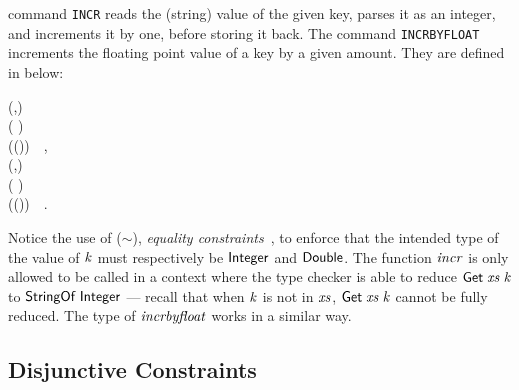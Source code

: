 \Redis{} command \texttt{INCR} reads the (string) value of the given key, parses
it as an integer, and increments it by one, before storing it back. The command
\texttt{INCRBYFLOAT} increments the floating point value of a key by a given
amount. They are defined in \Edis{} below:
\begin{hscode}\SaveRestoreHook
{}%
%
%
%
\>[B]{}\<[7]%
\>[7]{}\mathbin{::}(\;,\;\;\mathrel{\sim}\;){}\<[E]%
\\
\>[7]{}\Rightarrow {}\;\to {}\;\;\;( \uplus {}){}\<[E]%
\\
\>[B]{}\;\mathrel{=}\;(\;(\;))~~,{}\<[E]%
\\[\blanklineskip]%
\>[B]{}\<[14]%
\>[14]{}\mathbin{::}(\;,\;\;\mathrel{\sim}\;){}\<[E]%
\\
\>[14]{}\Rightarrow {}\;\to {}\to {}\;\;\;( \uplus {}){}\<[E]%
\\
\>[B]{}\;\;\mathrel{=}\;(\;(\;)\;)~~.{}\<[E]%
\ColumnHook
\end{hscode}\resethooks
Notice the use of (\ensuremath{\mathrel{\sim}}), \emph{equality constraints}~\cite{typeeq}, to enforce
that the intended type of the value of \ensuremath{\Varid{k}} must respectively be \ensuremath{\Conid{Integer}} and
\ensuremath{\Conid{Double}}. The function \ensuremath{\Varid{incr}} is only allowed to be called in a context where
the type checker is able to reduce \ensuremath{\Conid{Get}\;\Varid{xs}\;\Varid{k}} to \ensuremath{\Conid{StringOf}\;\Conid{Integer}} ---
recall that when \ensuremath{\Varid{k}} is not in \ensuremath{\Varid{xs}}, \ensuremath{\Conid{Get}\;\Varid{xs}\;\Varid{k}} cannot be fully reduced. The
type of \ensuremath{\Varid{incrbyfloat}} works in a similar way.

\subsection{Disjunctive Constraints}
\label{sec:disjunctive-constraints}

